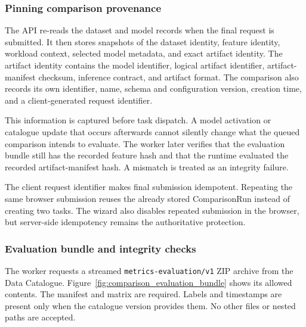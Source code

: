 \subsubsection{Pinning comparison provenance}

The API re-reads the dataset and model records when the final request is submitted. It then stores snapshots of the dataset identity, feature identity, workload context, selected model metadata, and exact artifact identity. The artifact identity contains the model identifier, logical artifact identifier, artifact-manifest checksum, inference contract, and artifact format. The comparison also records its own identifier, name, schema and configuration version, creation time, and a client-generated request identifier.

This information is captured before task dispatch. A model activation or catalogue update that occurs afterwards cannot silently change what the queued comparison intends to evaluate. The worker later verifies that the evaluation bundle still has the recorded feature hash and that the runtime evaluated the recorded artifact-manifest hash. A mismatch is treated as an integrity failure.

The client request identifier makes final submission idempotent. Repeating the same browser submission reuses the already stored ComparisonRun instead of creating two tasks. The wizard also disables repeated submission in the browser, but server-side idempotency remains the authoritative protection.

\subsubsection{Evaluation bundle and integrity checks}

The worker requests a streamed \texttt{metrics-evaluation/v1} ZIP archive from the Data Catalogue. Figure~\ref{fig:comparison_evaluation_bundle} shows its allowed contents. The manifest and matrix are required. Labels and timestamps are present only when the catalogue version provides them. No other files or nested paths are accepted.

